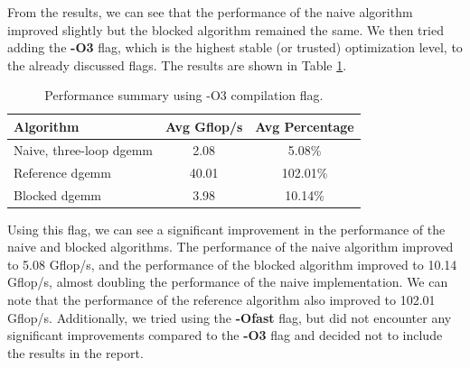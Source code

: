 \documentclass[unicode,11pt,a4paper,oneside,numbers=endperiod,openany]{scrartcl}
\begin{document}
From the results, we can see that the performance of the naive algorithm improved slightly
but the blocked algorithm remained the same. 
We then tried adding the \textbf{-O3} flag, which is the highest stable (or trusted) optimization level,
to the already discussed flags. 
The results are shown in Table \ref{tab:performance_summary_O3}.
\begin{table}[htbp]
    \centering
    \caption{Performance summary using -O3 compilation flag.}
    \begin{tabular}{||lcc||}
        \hline
        Algorithm & Avg Gflop/s & Avg Percentage \\
        \hline
        \hline
        Naive, three-loop dgemm & 2.08 & 5.08\% \\
        Reference dgemm & 40.01 & 102.01\% \\
        Blocked dgemm & 3.98 & 10.14\% \\
        \hline
    \end{tabular}\label{tab:performance_summary_O3}
\end{table}
Using this flag, we can see a significant improvement in the performance of the naive and blocked algorithms.
The performance of the naive algorithm improved to 5.08 Gflop/s, and the performance of the blocked algorithm
improved to 10.14 Gflop/s, almost doubling the performance of the naive implementation.
We can note that the performance of the reference algorithm also improved to 102.01 Gflop/s. 
Additionally, we tried using the \textbf{-Ofast} flag, but did not encounter any significant improvements 
compared to the \textbf{-O3} flag and decided not to include the results in the report.
\end{document}
